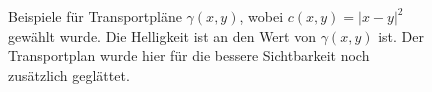 \begin{figure}
\centering
{}\hfill
{}
\caption{Beispiele für Transportpläne $\gamma(x,y)$,
wobei $c(x,y) = |x - y|^2$ gewählt wurde.
Die Helligkeit ist an den Wert von $\gamma(x,y)$ ist.
Der Transportplan wurde hier für die bessere Sichtbarkeit noch zusätzlich geglättet.
}
\label{mongekant:fig:transport_plans}
\end{figure}

